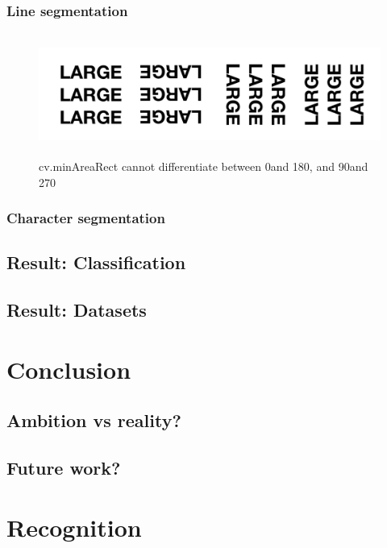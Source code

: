 \documentclass[11pt,a4paper,UKenglish]{report}
\begin{document}
\subsection{Line segmentation}




\begin{figure}[H]
  \centering
  \includegraphics[height=4cm]{res/4angle_rot.png}
  \caption{cv.minAreaRect cannot differentiate between 0\textdegree and 180\textdegree, and 90\textdegree and 270\textdegree}
  \label{fig:4angle_rot}
\end{figure}



\subsection{Character segmentation}

\section{Result: Classification}
\section{Result: Datasets}


\newpage
\chapter{Conclusion}
\label{sec:Conclusion}
\section{Ambition vs reality?}
\section{Future work?}

\newpage
\chapter{Recognition}
\label{sec:Recognition}
\end{document}
